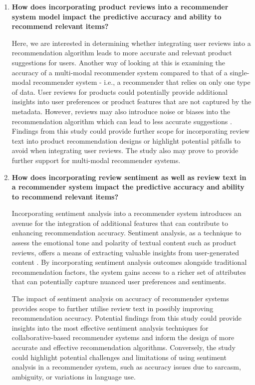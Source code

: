 \begin{enumerate}
    \item \textbf{How does incorporating product reviews into a recommender system model impact the predictive accuracy and ability to recommend relevant items?} 
    
    Here, we are interested in determining whether integrating user reviews into a recommendation algorithm leads to more accurate and relevant product suggestions for users. Another way of looking at this is examining the accuracy of a multi-modal recommender system compared to that of a single-modal recommender system - i.e., a recommender that relies on only one type of data. User reviews for products could potentially provide additional insights into user preferences or product features that are not captured by the metadata. However, reviews may also introduce noise or biases into the recommendation algorithm which can lead to less accurate suggestions \cite{zhang2014urcf}. Findings from this study could provide further scope for incorporating review text into product recommendation designs or highlight potential pitfalls to avoid when integrating user reviews. The study also may prove to provide further support for multi-modal recommender systems. 


    \item \textbf{How does incorporating review sentiment as well as review text in a recommender system impact the predictive accuracy and ability to recommend relevant items?} 
    
    Incorporating sentiment analysis into a recommender system introduces an avenue for the integration of additional features that can contribute to enhancing recommendation accuracy. Sentiment analysis, as a technique to assess the emotional tone and polarity of textual content such as product reviews, offers a means of extracting valuable insights from user-generated content \cite{medhat2014sentiment}. By incorporating sentiment analysis outcomes alongside traditional recommendation factors, the system gains access to a richer set of attributes that can potentially capture nuanced user preferences and sentiments. 

    The impact of sentiment analysis on accuracy of recommender systems provides scope to further utilise review text in possibly improving recommendation accuracy. Potential findings from this study could provide insights into the most effective sentiment analysis techniques for collaborative-based recommender systems and inform the design of more accurate and effective recommendation algorithms. Conversely, the study could highlight potential challenges and limitations of using sentiment analysis in a recommender system, such as accuracy issues due to sarcasm, ambiguity, or variations in language use. 


\end{enumerate}
